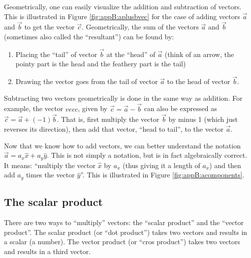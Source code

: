 Geometrically, one can easily visualize the addition and subtraction of vectors. This is illustrated in Figure \ref{fig:appB:aplusbvec} for the case of adding vectors $\vec a$ and $\vec b$ to get the vector $\vec c$. Geometrically, the sum of the vectors $\vec a$ and $\vec b$ (sometimes also called the ``resultant'') can be found by:
\begin{enumerate}
\item Placing the ``tail'' of vector $\vec b$ at the ``head'' of $\vec a$ (think of an arrow, the pointy part is the head and the feathery part is the tail)
\item Drawing the vector goes from the tail of vector $\vec a$ to the head of vector $\vec b$.
\end{enumerate}


Subtracting two vectors geometrically is done in the same way as addition. For example, the vector $vec c$, given by $\vec c=\vec a -\vec b$ can also be expressed as $\vec c = \vec a + (-1) \vec b$. That is, first multiply the vector $\vec b$ by minus 1 (which just reverses its direction), then add that vector, ``head to tail'', to the vector $\vec a$. 

Now that we know how to add vectors, we can better understand the notation $\vec a = a_x \hat x+ a_y\hat y$. This is not simply a notation, but is in fact algebraically correct. It means: ``multiply the vector $\hat x$ by $a_x$ (thus giving it a length of $a_x$) and then add $a_y$ times the vector $\hat y$''. This is illustrated in Figure \ref{fig:appB:acomponents}.



\subsection{The scalar product}
There are two ways to ``multiply'' vectors: the ``scalar product'' and the ``vector product''. The scalar product (or ``dot product'') takes two vectors and results in a scalar (a number). The vector product (or ``cros product'') takes two vectors and results in a third vector. 

